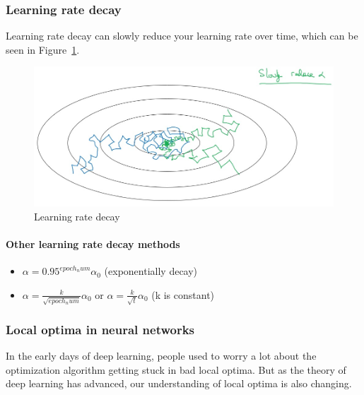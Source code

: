 \documentclass[UTF8]{article}
\begin{document}
\subsubsection{Learning rate decay}
Learning rate decay can slowly reduce your learning rate over time, which can be seen in
Figure~\ref{fig:learning-rate-decay}.

\begin{figure}[htb]
    \centering
    \includegraphics[width=35em]{figures/learning-rate-decay}
    \caption{Learning rate decay}
    \label{fig:learning-rate-decay}
\end{figure}

\begin{algorithm}[htb]
\end{algorithm}

\paragraph{Other learning rate decay methods}
\begin{itemize}
    \item $\displaystyle \alpha = 0.95^{epoch_num} \alpha_0$ (exponentially decay)
    \item $\displaystyle \alpha = \frac{k}{\sqrt{epoch_num}} \alpha_0$ \quad or \quad
    $\displaystyle \alpha = \frac{k}{\sqrt{t}} \alpha_0$ \qquad (k is constant)
\end{itemize}

\subsubsection{Local optima in neural networks}
In the early days of deep learning, people used to worry a lot about the optimization algorithm
getting stuck in bad local optima. But as the theory of deep learning has advanced, our
understanding of local optima is also changing.
\end{document}
